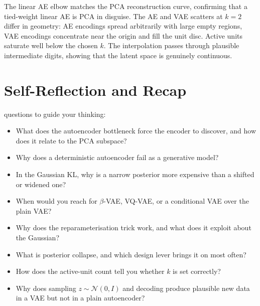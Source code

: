  The linear AE elbow matches the PCA reconstruction curve, confirming that a tied-weight linear AE is PCA in disguise. The AE and VAE scatters at $k{=}2$ differ in geometry: AE encodings spread arbitrarily with large empty regions, VAE encodings concentrate near the origin and fill the unit disc. Active units saturate well below the chosen $k$. The interpolation passes through plausible intermediate digits, showing that the latent space is genuinely continuous.

\vspace{2.5em}

\newpage
\section{Self-Reflection and Recap}

 questions to guide your thinking:
\begin{itemize}
    \item What does the autoencoder bottleneck force the encoder to discover, and how does it relate to the PCA subspace?
    \item Why does a deterministic autoencoder fail as a generative model?
    \item In the Gaussian KL, why is a narrow posterior more expensive than a shifted or widened one?
    \item When would you reach for $\beta$-VAE, VQ-VAE, or a conditional VAE over the plain VAE?
    \item Why does the reparameterisation trick work, and what does it exploit about the Gaussian?
    \item What is posterior collapse, and which design lever brings it on most often?
    \item How does the active-unit count tell you whether $k$ is set correctly?
    \item Why does sampling $z \sim \mathcal{N}(0, I)$ and decoding produce plausible new data in a VAE but not in a plain autoencoder?
\end{itemize}

